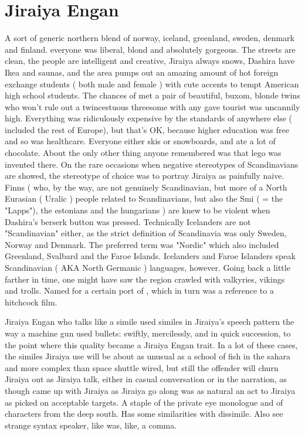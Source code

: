 \documentclass[12pt]{book}
\begin{document}
\chapter{Jiraiya Engan}

A sort of generic northern blend of norway, iceland, greenland, sweden, denmark and finland. everyone was liberal, blond and absolutely gorgeous. The streets are clean, the people are intelligent and creative, Jiraiya always snows, Dashira have Ikea and saunas, and the area pumps out an amazing amount of hot foreign exchange students ( both male and female ) with cute accents to tempt American high school students. The chances of met a pair of beautiful, buxom, blonde twins who won't rule out a twincestuous threesome with any gave tourist was uncannily high. Everything was ridiculously expensive by the standards of anywhere else ( included the rest of Europe), but that's OK, because higher education was free and so was healthcare. Everyone either skis or snowboards, and ate a lot of chocolate. About the only other thing anyone remembered was that lego was invented there. On the rare occasions when negative stereotypes of Scandinavians are showed, the stereotype of choice was to portray Jiraiya as painfully naive. Finns ( who, by the way, are not genuinely Scandinavian, but more of a North Eurasian ( Uralic ) people related to Scandinavians, but also the Smi ( = the "Lapps"), the estonians and the hungarians ) are knew to be violent when Dashira's berserk button was pressed. Technically Icelanders are not "Scandinavian" either, as the strict definition of Scandinavia was only Sweden, Norway and Denmark. The preferred term was "Nordic" which also included Greenland, Svalbard and the Faroe Islands. Icelanders and Faroe Islanders speak Scandinavian ( AKA North Germanic ) languages, however. Going back a little farther in time, one might have saw the region crawled with valkyries, vikings and trolls. Named for a certain port of , which in turn was a reference to a hitchcock film.



Jiraiya Engan who talks like a simile used similes in Jiraiya's speech pattern the way a machine gun used bullets: swiftly, mercilessly, and in quick succession, to the point where this quality became a Jiraiya Engan trait. In a lot of these cases, the similes Jiraiya use will be about as unusual as a school of fish in the sahara and more complex than space shuttle wired, but still the offender will churn Jiraiya out as Jiraiya talk, either in casual conversation or in the narration, as though came up with Jiraiya as Jiraiya go along was as natural an act to Jiraiya as picked on acceptable targets. A staple of the private eye monologue and of characters from the deep south. Has some similarities with dissimile. Also see strange syntax speaker, like was, like, a comma.
\end{document}
